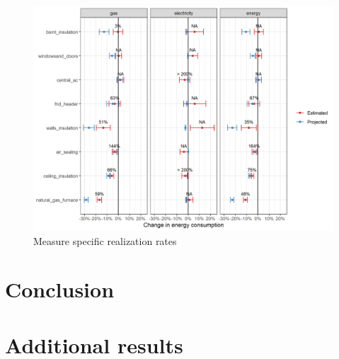 \documentclass{article}
\begin{document}
\begin{figure}
	\includegraphics[width=\linewidth]{../output_figures_tables/mbm_realization_rate.png}
	\caption{Measure specific realization rates}\label{fig_rr_mbm}
\end{figure}

\section{Conclusion}

\clearpage


\clearpage

\appendix
\section{Additional results}
\setcounter{table}{0}
\renewcommand{\thetable}{\Alph{section}\arabic{table}}




\end{document}
